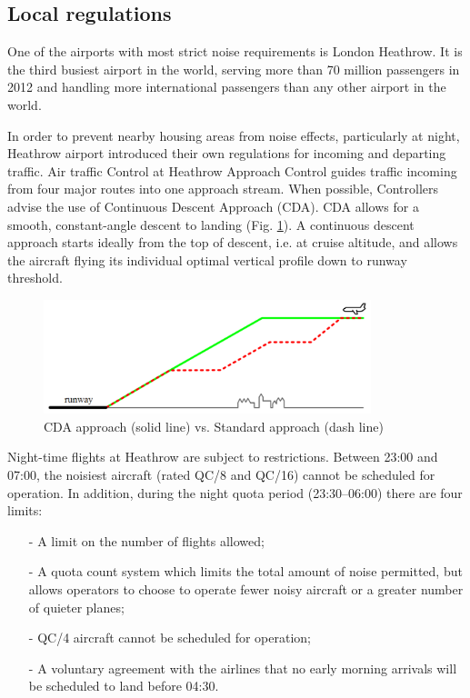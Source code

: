 \subsection{Local regulations}

One of the airports with most strict noise requirements is London Heathrow. It is the third busiest airport in the world, serving more than 70 million passengers in 2012 and handling more international passengers than any other airport in the world.

In order to prevent nearby housing areas from noise effects, particularly at night, Heathrow airport introduced their own regulations for incoming and departing traffic. Air traffic Control at Heathrow Approach Control guides traffic incoming from four major routes into one approach stream. When possible, Controllers advise the use of Continuous Descent Approach (CDA). CDA allows for a smooth, constant-angle descent to landing (Fig. \ref{cda}). A continuous descent approach starts ideally from the top of descent, i.e. at cruise altitude, and allows the aircraft flying its individual optimal vertical profile down to runway threshold.

\begin{figure}[h!]
\centering %
\includegraphics[width=0.85\textwidth]{Pictures/cda.png}
\caption{CDA approach (solid line) vs. Standard approach (dash line)}
\label{cda}
\end{figure}

Night-time flights at Heathrow are subject to restrictions. Between 23:00 and 07:00, the noisiest aircraft (rated QC/8 and QC/16) cannot be scheduled for operation. In addition, during the night quota period (23:30–06:00) there are four limits:

\begin{itemize}
\item[-] A limit on the number of flights allowed;
\item[-] A quota count system which limits the total amount of noise permitted, but allows operators to choose to operate fewer noisy aircraft or a greater number of quieter planes;
\item[-] QC/4 aircraft cannot be scheduled for operation;
\item[-] A voluntary agreement with the airlines that no early morning arrivals will be scheduled to land before 04:30.
\end{itemize}

